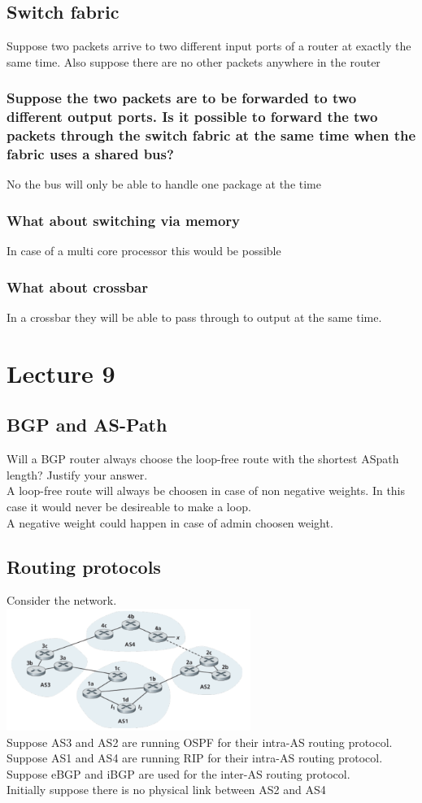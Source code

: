 \documentclass[12pt, a4paper]{article}
\begin{document}
		\subsection{Switch fabric}
			Suppose two packets arrive to two different input ports of a router at exactly the same time. Also suppose there are no other packets anywhere in the router
			\subsubsection{Suppose the two packets are to be forwarded to two different output ports. Is it possible to forward the two packets through the switch fabric at the same time when the fabric uses a shared bus?}
				No the bus will only be able to handle one package at the time
			\subsubsection{What about switching via memory}
				In case of a multi core processor this would be possible
			\subsubsection{What about crossbar}
				In a crossbar they will be able to pass through to output at the same time.
	\section{Lecture 9}
		\subsection{BGP and AS-Path}
			Will a BGP router always choose the loop-free route with the shortest ASpath length? Justify your answer.\\
			A loop-free route will always be choosen in case of non negative weights. In this case it would never be desireable to make a loop.\\
			A negative weight could happen in case of admin choosen weight.
		\subsection{Routing protocols}
			Consider the network.\\
			\includegraphics[width=300px]{assets/9.2.png}\\
			Suppose AS3 and AS2 are running OSPF for their intra-AS routing protocol.\\
			Suppose AS1 and AS4 are running RIP for their intra-AS routing protocol.\\
			Suppose eBGP and iBGP are used for the inter-AS routing protocol.\\
			Initially suppose there is no physical link between AS2 and AS4
\end{document}
